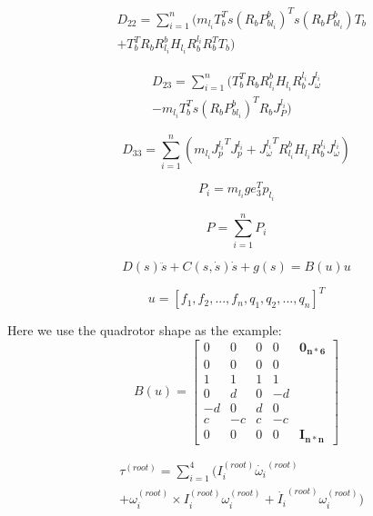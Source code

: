 \documentclass{jarticle}
\begin{document}
\begin{eqnarray}
  & D_{22} = \sum_{i=1}^{n}(m_{l_i} T_b^T s(R_b P_{bl_i}^b)^T s(R_b P_{bl_i}^b) T_b \\ \nonumber
  & + T_b^T R_b R_{l_i}^b H_{l_i} R_b^{l_i} R_b^T T_b)
\end{eqnarray}

\begin{eqnarray}
  D_{23} = \sum_{i=1}^{n}(T_b^T R_b R_{l_i}^b H_{l_i} R_b^{l_i} J_\omega^{l_i} \\
  \nonumber
  - m_{l_i} T_b^T s(R_b P_{bl_i}^b)^T R_b J_P^{l_i})
\end{eqnarray}

\begin{equation}
  D_{33} = \sum_{i=1}^{n}(m_{l_i} {J_p^{l_i}}^T J_p^{l_i}
  + {J_\omega^{l_i}}^T R_{l_i}^b H_{l_i} R_b^{l_i} J_\omega^{l_i})
\end{equation}

\begin{equation}
  P_i = m_{l_i} g e_3^T p_{l_i}
\end{equation}

\begin{equation}
  P = \sum_{i=1}^{n}{P_i}
\end{equation}

\begin{equation}
  D(s) \ddot{s} + C(s, \dot{s}) \dot{s} + g(s) = B(u) u
\end{equation}

\begin{equation}
  u = [f_1, f_2, ..., f_n, q_1, q_2, ..., q_n]^T
\end{equation}

Here we use the quadrotor shape as the example:
\begin{equation}
  B(u) = \begin{bmatrix}
    0 & 0 & 0 & 0 & \bm{0_{n*6}} \\
    0 & 0 & 0 & 0  \\
    1 & 1 & 1 & 1  \\
    0 & d & 0 & -d \\
    -d & 0 & d & 0 \\
    c & -c & c & -c \\
    0 & 0 & 0 & 0 & \bm{I_{n*n}}
  \end{bmatrix}
\end{equation}

\begin{eqnarray}
  &\tau^{(root)} = \sum_{i=1}^{4}(I_i^{(root)} \dot{\omega_i}^{(root)} \\  \nonumber
  & + \omega_i^{(root)} \times I_i^{(root)} \omega_i^{(root)}
  + \dot{I_i}^{(root)} \omega_i^{(root)})
\end{eqnarray}
\end{document}
